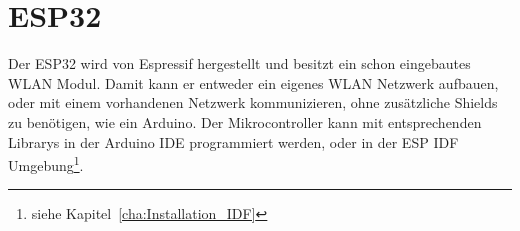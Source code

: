 \section{ESP32}
Der ESP32 wird von Espressif hergestellt und besitzt ein schon eingebautes WLAN Modul. Damit kann er entweder ein eigenes WLAN Netzwerk aufbauen, oder mit einem vorhandenen Netzwerk kommunizieren, ohne zusätzliche Shields zu benötigen, wie ein Arduino. Der Mikrocontroller kann mit entsprechenden Librarys in der Arduino IDE programmiert werden, oder in der ESP IDF Umgebung\footnote{siehe Kapitel~\ref{cha:Installation_IDF}}.
